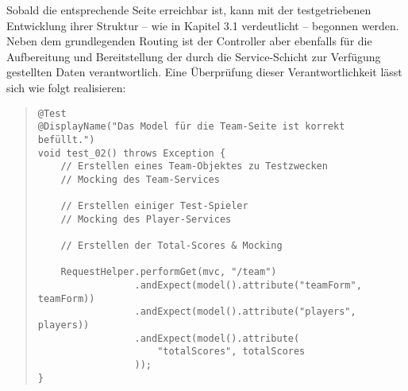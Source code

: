 Sobald die entsprechende Seite erreichbar ist, kann mit der testgetriebenen 
Entwicklung ihrer Struktur -- wie in Kapitel 3.1 verdeutlicht -- begonnen werden. 
Neben dem grundlegenden Routing ist der Controller aber ebenfalls für die 
Aufbereitung und Bereitstellung der durch die Service-Schicht zur Verfügung 
gestellten Daten verantwortlich. Eine Überprüfung dieser Verantwortlichkeit lässt 
sich wie folgt realisieren: 

\begin{quote}
\begin{verbatim}
@Test
@DisplayName("Das Model für die Team-Seite ist korrekt befüllt.")
void test_02() throws Exception {
    // Erstellen eines Team-Objektes zu Testzwecken
    // Mocking des Team-Services
    
    // Erstellen einiger Test-Spieler
    // Mocking des Player-Services
    
    // Erstellen der Total-Scores & Mocking

    RequestHelper.performGet(mvc, "/team")
                 .andExpect(model().attribute("teamForm", teamForm))
                 .andExpect(model().attribute("players", players))
                 .andExpect(model().attribute(
                     "totalScores", totalScores
                 ));
}
\end{verbatim}
\end{quote}

